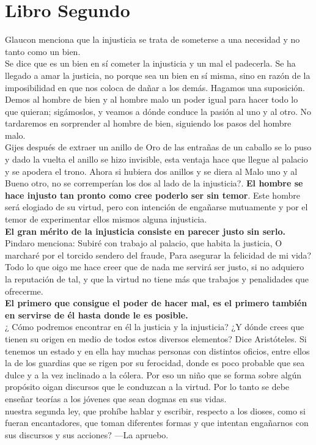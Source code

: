 \documentclass[10pt]{book}
\begin{document}
\chapter*{Libro Segundo}
Glaucon menciona que la injusticia se trata de someterse a una necesidad y no tanto como un bien. \\
Se dice que es un bien en sí cometer la injusticia y un mal el padecerla. Se ha llegado a amar la justicia, no porque sea un bien en sí misma, sino en razón de la imposibilidad en que nos coloca de dañar a los demás. Hagamos una suposición. Demos al hombre de bien y al hombre malo un poder igual para hacer todo lo que quieran; sigámoslos, y veamos a dónde conduce la pasión al uno y al otro. No tardaremos en sorprender al hombre de bien, siguiendo los pasos del hombre malo. \\
Gijes después de extraer un anillo de Oro de las entrañas de un caballo se lo puso y dado la vuelta el anillo se hizo invisible, esta ventaja hace que llegue al palacio y se apodera el trono. Ahora si hubiera dos anillos y se diera al Malo uno y al Bueno otro, no se corremperían los dos al lado de la injusticia?. \textbf{El hombre se hace injusto tan pronto como cree poderlo ser sin temor}. Este hombre será elogiado de su virtud, pero con intención de engañarse mutuamente y por el temor de experimentar ellos mismos alguna injusticia.\\
\textbf{El gran mérito de la injusticia consiste en parecer justo sin serlo.} \\
Pindaro menciona: Subiré con trabajo al palacio, que habita la justicia, O marcharé por el torcido sendero del fraude, Para asegurar la felicidad de mi vida?\\
Todo lo que oigo me hace creer que de nada me servirá ser justo, si no adquiero la reputación de tal, y que  la virtud no tiene más que trabajos y penalidades que ofrecerme. \\
\textbf{El primero que consigue el poder de hacer mal, es el primero también en servirse de él hasta donde le es posible.} \\
¿ Cómo podremos encontrar en él la justicia y la injusticia? ¿Y dónde crees que tienen su origen en medio de todos estos diversos elementos? Dice Aristóteles. Si tenemos un estado y en ella hay muchas personas con distintos oficios, entre ellos la de los guardias que se rigen por su ferocidad, donde es poco probable que sea dulce y a la vez inclinado a la cólera. Por eso un niño que se forma sobre algún propósito oigan discursos que le conduzcan a la virtud. Por lo tanto se debe enseñar teorías a los jóvenes que sean dogmas en sus vidas.\\
nuestra segunda ley, que prohíbe hablar y escribir, respecto a los dioses, como si fueran encantadores, que toman diferentes formas y que intentan engañarnos con sus discursos y sus acciones? —La apruebo.
\end{document}
